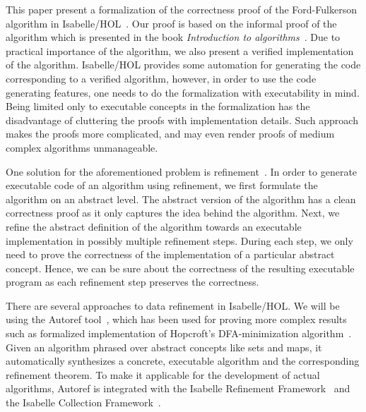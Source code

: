\documentclass{llncs}
\begin{document}
This paper present a formalization of the correctness proof of the Ford-Fulkerson algorithm in Isabelle/HOL~\cite{NPW02}. Our proof is based on the informal proof of the algorithm which is presented in the book \emph{Introduction to algorithms}~\cite{CLRS09}. Due to practical importance of the algorithm, we also present a verified implementation of the algorithm. Isabelle/HOL provides some automation for generating the code corresponding to a verified algorithm, however, in order to use the code generating features, one needs to do the formalization with executability in mind. Being limited only to executable concepts in the formalization has the disadvantage of cluttering the proofs with implementation details. Such approach makes the proofs more complicated, and may even render proofs of medium complex algorithms unmanageable.

One solution for the aforementioned problem is refinement~\cite{Morr87}. In order to generate executable code of an algorithm using refinement, we first formulate the algorithm on an abstract level. The abstract version of the algorithm has a clean correctness proof as it only captures the idea behind the algorithm. Next, we refine the abstract definition of the algorithm towards an executable implementation in possibly multiple refinement steps. During each step, we only need to prove the correctness of the implementation of a particular abstract concept. Hence, we can be sure about the correctness of the resulting executable program as each refinement step preserves the correctness.

There are several approaches to data refinement in Isabelle/HOL. We will be using the Autoref tool~\cite{La13}, which has been used for proving more complex results such as formalized implementation of Hopcroft’s DFA-minimization algorithm~\cite{LaTu12}. Given an algorithm phrased over abstract concepts like sets and maps, it automatically synthesizes a concrete, executable algorithm and the corresponding refinement theorem. To make it applicable for the development of actual algorithms, Autoref is integrated with the Isabelle Refinement Framework~\cite{La12} and the Isabelle Collection Framework~\cite{LL10}.
\end{document}
